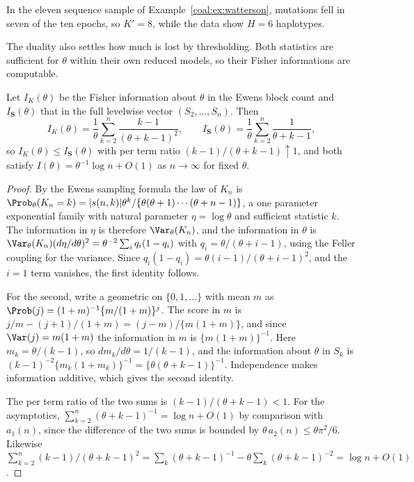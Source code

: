 In the eleven sequence sample of Example~\ref{coal:ex:watterson}, mutations fell in seven of the ten epochs, so $K'=8$, while the data show $H=6$ haplotypes.

The duality also settles how much is lost by thresholding. Both statistics are sufficient for $\theta$ within their own reduced models, so their Fisher informations are computable.

\begin{proposition}[Information]\label{coal:prop:info}
Let $I_K(\theta)$ be the Fisher information about $\theta$ in the Ewens block count and $I_{\bm S}(\theta)$ that in the full levelwise vector $(S_2,\dots,S_n)$. Then
\begin{equation}\label{coal:eq:info}
I_K(\theta)=\frac1\theta\sum_{k=2}^n\frac{k-1}{(\theta+k-1)^2},\qquad
I_{\bm S}(\theta)=\frac1\theta\sum_{k=2}^n\frac{1}{\theta+k-1},
\end{equation}
so $I_K(\theta)\le I_{\bm S}(\theta)$ with per term ratio $(k-1)/(\theta+k-1)\uparrow1$, and both satisfy $I(\theta)=\theta^{-1}\log n+O(1)$ as $n\to\infty$ for fixed $\theta$.
\end{proposition}

\begin{proof}
By the Ewens sampling formula the law of $K_n$ is $\Prob_\theta(K_n=k)=|s(n,k)|\theta^k/\{\theta(\theta+1)\cdots(\theta+n-1)\}$, a one parameter exponential family with natural parameter $\eta=\log\theta$ and sufficient statistic $k$. The information in $\eta$ is therefore $\Var_\theta(K_n)$, and the information in $\theta$ is $\Var_\theta(K_n)(d\eta/d\theta)^2=\theta^{-2}\sum_i q_i(1-q_i)$ with $q_i=\theta/(\theta+i-1)$, using the Feller coupling for the variance. Since $q_i(1-q_i)=\theta(i-1)/(\theta+i-1)^2$, and the $i=1$ term vanishes, the first identity follows.

For the second, write a geometric on $\{0,1,\dots\}$ with mean $m$ as $\Prob(j)=(1+m)^{-1}\{m/(1+m)\}^j$. The score in $m$ is $j/m-(j+1)/(1+m)=(j-m)/\{m(1+m)\}$, and since $\Var(j)=m(1+m)$ the information in $m$ is $\{m(1+m)\}^{-1}$. Here $m_k=\theta/(k-1)$, so $dm_k/d\theta=1/(k-1)$, and the information about $\theta$ in $S_k$ is $(k-1)^{-2}\{m_k(1+m_k)\}^{-1}=\{\theta(\theta+k-1)\}^{-1}$. Independence makes information additive, which gives the second identity.

The per term ratio of the two sums is $(k-1)/(\theta+k-1)<1$. For the asymptotics, $\sum_{k=2}^n(\theta+k-1)^{-1}=\log n+O(1)$ by comparison with $a_1(n)$, since the difference of the two sums is bounded by $\theta\, a_2(n)\le\theta\pi^2/6$. Likewise $\sum_{k=2}^n(k-1)/(\theta+k-1)^2=\sum_k(\theta+k-1)^{-1}-\theta\sum_k(\theta+k-1)^{-2}=\log n+O(1)$.
\end{proof}

